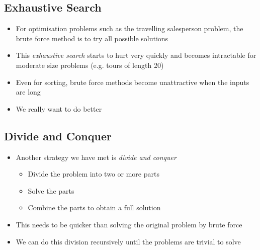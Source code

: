 
\begin{slide}
\section{Exhaustive Search}

\begin{PauseHighLight}
  \begin{itemize}
  \item For optimisation problems such as the travelling salesperson
    problem, the brute force method is to try all possible
    solutions\pause
  \item This \emph{exhaustive search} starts to hurt very quickly and
    becomes intractable for moderate size problems (e.g. tours of length
    20)\pause
  \item Even for sorting, brute force methods become unattractive when
    the inputs are long\pause
  \item We really want to do better\pause
  \end{itemize}
\end{PauseHighLight}

\end{slide}


\begin{slide}
\section[-1]{Divide and Conquer}
\begin{PauseHighLight}
  \begin{itemize}
  \item Another strategy we have met is \emph{divide and conquer}\pause
    \begin{itemize}
    \item Divide the problem into two or more parts
    \item Solve the parts
    \item Combine the parts to obtain a full solution\pause
    \end{itemize}
  \item This needs to be quicker than solving the original problem by
    brute force\pause
  \item We can do this division recursively until the problems are
    trivial to solve\pause
  \end{itemize}
\end{PauseHighLight}

\end{slide}

